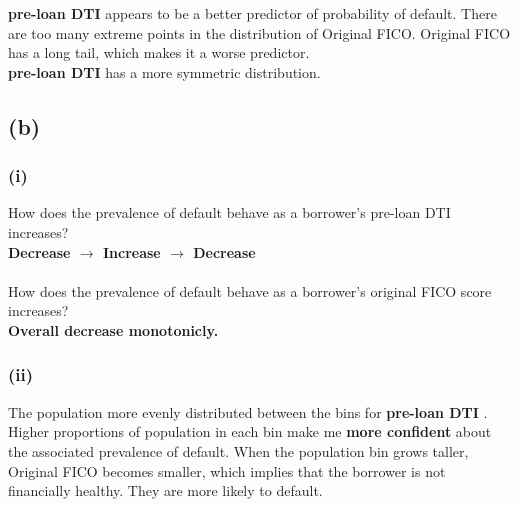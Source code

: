 \documentclass{homework}
\begin{document}
 \textbf{pre-loan DTI} appears to be a better predictor of probability of default.  There are too many extreme points in the distribution of Original FICO. Original FICO has a long tail, which makes it a worse predictor. \\
 \textbf{pre-loan DTI} has a more symmetric distribution.\\



\subsection*{(b)}
\subsubsection*{(i)}
How does the prevalence of default behave as a borrower’s pre-loan DTI increases?\\
 \textbf{Decrease $\rightarrow $ Increase $\rightarrow $ Decrease}\\
\\
How does the prevalence of default behave as a borrower’s original FICO score increases?\\
 \textbf{Overall decrease monotonicly.}\\


\subsubsection*{(ii)}
The population more evenly distributed between the bins for \textbf{pre-loan DTI }.\\
Higher proportions of population in each bin make me \textbf{more confident} about the associated prevalence of default. When the population bin grows taller, Original FICO becomes smaller, which implies that the borrower is not financially healthy. They are more likely to default. 
\end{document}
